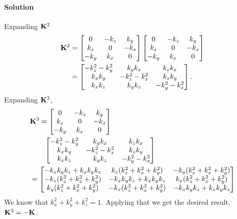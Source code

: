 \documentclass[twocolumn]{article}
\begin{document}
\paragraph*{Solution}
Expanding $\mathbf{K}^2$
\begin{align}
  \mathbf{K}^2 &= \begin{bmatrix}
    0 & -k_z & k_y \\
    k_z & 0 & -k_x \\
    -k_y & k_x & 0
  \end{bmatrix}
                 \begin{bmatrix}
                   0 & -k_z & k_y \\
                   k_z & 0 & -k_x \\
                   -k_y & k_x & 0
                 \end{bmatrix}
  \\
         &= \begin{bmatrix}
           -k_z^2 - k_y^2  & k_y k_x & k_z k_x \\
           k_xk_y & -k_z^2 - k_x^2 & k_z k_y \\
           k_x k_z & k_y k_z & -k_y^2 - k_x^2
         \end{bmatrix}.
\end{align}
Expanding $\mathbf{K}^3$,
\begin{align}
  &\mathbf{K}^3 = \begin{bmatrix}
    0 & -k_z & k_y \\
    k_z & 0 & -k_x \\
    -k_y & k_x & 0
  \end{bmatrix}
                 \notag\\&\qquad
         \begin{bmatrix}
           -k_z^2 - k_y^2  & k_y k_x & k_z k_x \\
           k_xk_y & -k_z^2 - k_x^2 & k_z k_y \\
           k_x k_z & k_y k_z & -k_y^2 - k_x^2
         \end{bmatrix}
  \\&=
  \begin{bmatrix}
    -k_xk_yk_z +k_xk_yk_z & k_z (k_z^2 + k_x^2 + k_y^2) & -k_y (k_z^2 + k_x^2 + k_y^2)\\
    -k_z (k_z^2 + k_x^2 + k_y^2) & -k_xk_yk_z +k_xk_yk_z & k_x (k_z^2 + k_x^2 + k_y^2)\\
    k_y (k_z^2 + k_x^2 + k_y^2) & -k_x (k_z^2 + k_x^2 + k_y^2) & -k_xk_yk_z +k_xk_yk_z
    \end{bmatrix}
\end{align}
We know that $k_x^2 + k_y^2 + k_z^2 = 1$. Applying that we get the desired
result, $\mathbf{K}^3 = - \mathbf{K}$.
\end{document}
